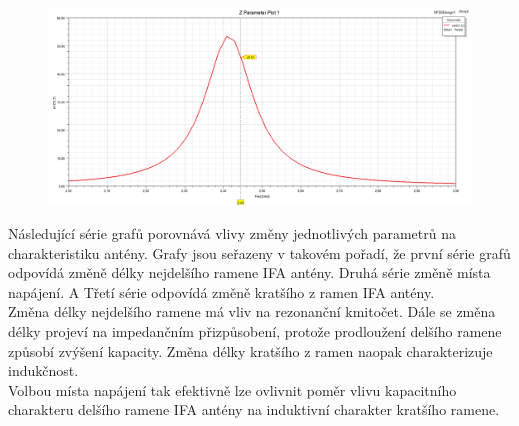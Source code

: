 \documentclass[10pt, a4paper]{article}%
\begin{document}
\begin{figure}[ht!]
	\centering
	\includegraphics[width= 1\textwidth]{Z Parameter Plot 1.png}
\end{figure}

Následující série grafů porovnává vlivy změny jednotlivých parametrů na charakteristiku antény.
Grafy jsou seřazeny v takovém pořadí, že první série grafů odpovídá změně délky nejdelšího ramene
IFA  antény. Druhá série změně místa napájení. A Třetí série
odpovídá změně kratšího z ramen IFA antény.\\
Změna délky nejdelšího ramene má vliv na rezonanční kmitočet. Dále se změna délky projeví na impedančním přizpůsobení,
protože prodloužení delšího ramene způsobí zvýšení kapacity. Změna délky kratšího z ramen naopak charakterizuje
indukčnost.\\
Volbou místa napájení tak efektivně lze ovlivnit poměr vlivu kapacitního charakteru delšího ramene IFA antény na 
induktivní charakter kratšího ramene.\\
\end{document}
